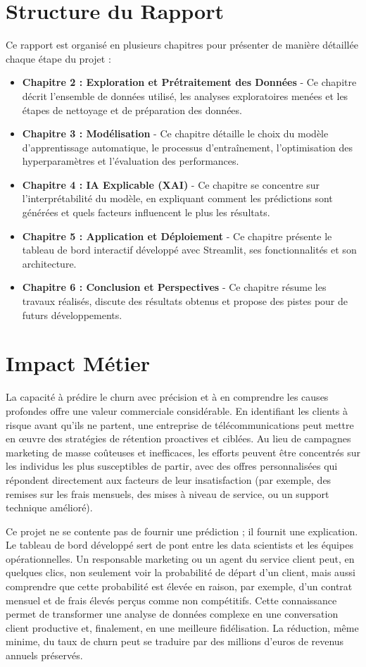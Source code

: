 \section{Structure du Rapport}
Ce rapport est organisé en plusieurs chapitres pour présenter de manière détaillée chaque étape du projet :
\begin{itemize}
    \item \textbf{Chapitre 2 : Exploration et Prétraitement des Données} - Ce chapitre décrit l'ensemble de données utilisé, les analyses exploratoires menées et les étapes de nettoyage et de préparation des données.
    \item \textbf{Chapitre 3 : Modélisation} - Ce chapitre détaille le choix du modèle d'apprentissage automatique, le processus d'entraînement, l'optimisation des hyperparamètres et l'évaluation des performances.
    \item \textbf{Chapitre 4 : IA Explicable (XAI)} - Ce chapitre se concentre sur l'interprétabilité du modèle, en expliquant comment les prédictions sont générées et quels facteurs influencent le plus les résultats.
    \item \textbf{Chapitre 5 : Application et Déploiement} - Ce chapitre présente le tableau de bord interactif développé avec Streamlit, ses fonctionnalités et son architecture.
    \item \textbf{Chapitre 6 : Conclusion et Perspectives} - Ce chapitre résume les travaux réalisés, discute des résultats obtenus et propose des pistes pour de futurs développements.
\end{itemize}

\section{Impact Métier}
La capacité à prédire le churn avec précision et à en comprendre les causes profondes offre une valeur commerciale considérable. En identifiant les clients à risque avant qu'ils ne partent, une entreprise de télécommunications peut mettre en œuvre des stratégies de rétention proactives et ciblées. Au lieu de campagnes marketing de masse coûteuses et inefficaces, les efforts peuvent être concentrés sur les individus les plus susceptibles de partir, avec des offres personnalisées qui répondent directement aux facteurs de leur insatisfaction (par exemple, des remises sur les frais mensuels, des mises à niveau de service, ou un support technique amélioré).

Ce projet ne se contente pas de fournir une prédiction ; il fournit une explication. Le tableau de bord développé sert de pont entre les data scientists et les équipes opérationnelles. Un responsable marketing ou un agent du service client peut, en quelques clics, non seulement voir la probabilité de départ d'un client, mais aussi comprendre que cette probabilité est élevée en raison, par exemple, d'un contrat mensuel et de frais élevés perçus comme non compétitifs. Cette connaissance permet de transformer une analyse de données complexe en une conversation client productive et, finalement, en une meilleure fidélisation. La réduction, même minime, du taux de churn peut se traduire par des millions d'euros de revenus annuels préservés.
